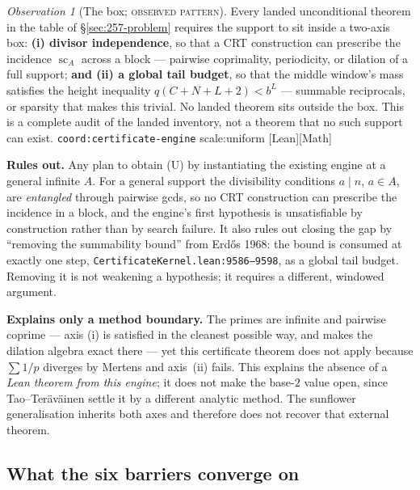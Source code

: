 \documentclass[11pt]{article}
\theoremstyle{plain}
\theoremstyle{definition}
\theoremstyle{remark}
\newtheorem{obs}[thm]{Observation}
\newcommand{\lean}[2]{\leanlink{#2}}
\newcommand{\ev}[1]{{\small\textsf{[#1]}}\xspace}
\newcommand{\scale}[1]{{\small\textsf{scale:#1}}\xspace}
\newcommand{\coord}[1]{\texorpdfstring{{\small\nolinkurl{coord:#1}}}{coord:#1}\xspace}
\begin{document}
\begin{obs}[The box; \textsc{observed pattern}]
\label{obs:box}
Every landed unconditional theorem in the table of \S\ref{sec:257-problem} requires the support to
sit inside a two-axis box: \textbf{(i) divisor independence}, so that a CRT construction can
prescribe the incidence $\operatorname{sc}_A$ across a block --- pairwise coprimality, periodicity,
or dilation of a full support; \textbf{and (ii) a global tail budget}, so that the middle window's
mass satisfies the height inequality $q(C+N+L+2) < b^L$ --- summable reciprocals, or sparsity that
makes this trivial. No landed theorem sits outside the box. This is a complete audit of the landed
inventory, not a theorem that no such support can exist.
\coord{certificate-engine} \scale{uniform} \ev{Lean}\ev{Math}
\end{obs}

\textbf{Rules out.} Any plan to obtain (U) by instantiating the existing engine at a general
infinite $A$. For a general support the divisibility conditions $a \mid n$, $a \in A$, are
\emph{entangled} through pairwise gcds, so no CRT construction can prescribe the incidence in a
block, and the engine's first hypothesis is unsatisfiable by construction rather than by search
failure. It also rules out closing the gap by ``removing the summability bound'' from Erd\H{o}s
1968: the bound is consumed at exactly one step, \texttt{CertificateKernel.lean:9586--9598}, as a
global tail budget. Removing it is not weakening a hypothesis; it requires a different, windowed
argument.

\textbf{Explains only a method boundary.} The primes are infinite and pairwise coprime
--- axis (i) is satisfied in the cleanest possible way, and
\lean{compositeDilationDefect\_eq\_zero\_of\_prime\_support}{CompositeDilationDefect.lean:103} makes
the dilation algebra exact there --- yet this certificate theorem does not
apply because $\sum1/p$ diverges by Mertens and axis~(ii) fails.  This explains
the absence of a \emph{Lean theorem from this engine}; it does not make the
base-$2$ value open, since Tao--Ter\"av\"ainen settle it by a different
analytic method.  The sunflower generalisation inherits both axes and
therefore does not recover that external theorem.

\subsection{What the six barriers converge on}
\end{document}
